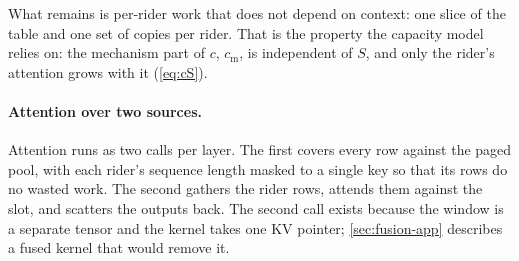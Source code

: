 What remains is per-rider work that does not depend on context: one slice of
the table and one set of copies per rider. That is the property the capacity
model relies on: the mechanism part of $c$, $c_{\mathrm{m}}$, is independent of
$S$, and only the rider's attention grows with it (\cref{eq:cS}).

\paragraph{Attention over two sources.} Attention runs as two calls per layer.
The first covers every row against the paged pool, with each rider's sequence
length masked to a single key so that its rows do no wasted work. The second
gathers the rider rows, attends them against the slot, and scatters the
outputs back. The second call exists because the window is a separate tensor
and the kernel takes one KV pointer; \cref{sec:fusion-app} describes a fused
kernel that would remove it.


